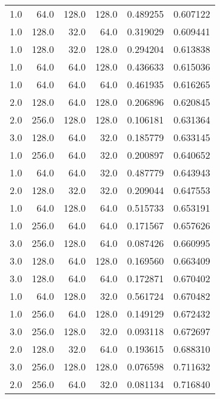 \begin{longtable}{rrrrrr}
        1.0 &      64.0 &       128.0 &    128.0 &      0.489255 &    0.607122 \\
        1.0 &     128.0 &        32.0 &     64.0 &      0.319029 &    0.609441 \\
        1.0 &     128.0 &        32.0 &    128.0 &      0.294204 &    0.613838 \\
        1.0 &      64.0 &        64.0 &    128.0 &      0.436633 &    0.615036 \\
        1.0 &      64.0 &        64.0 &     64.0 &      0.461935 &    0.616265 \\
        2.0 &     128.0 &        64.0 &    128.0 &      0.206896 &    0.620845 \\
        2.0 &     256.0 &       128.0 &    128.0 &      0.106181 &    0.631364 \\
        3.0 &     128.0 &        64.0 &     32.0 &      0.185779 &    0.633145 \\
        1.0 &     256.0 &        64.0 &     32.0 &      0.200897 &    0.640652 \\
        1.0 &      64.0 &        64.0 &     32.0 &      0.487779 &    0.643943 \\
        2.0 &     128.0 &        32.0 &     32.0 &      0.209044 &    0.647553 \\
        1.0 &      64.0 &       128.0 &     64.0 &      0.515733 &    0.653191 \\
        1.0 &     256.0 &        64.0 &     64.0 &      0.171567 &    0.657626 \\
        3.0 &     256.0 &       128.0 &     64.0 &      0.087426 &    0.660995 \\
        3.0 &     128.0 &        64.0 &    128.0 &      0.169560 &    0.663409 \\
        3.0 &     128.0 &        64.0 &     64.0 &      0.172871 &    0.670402 \\
        1.0 &      64.0 &       128.0 &     32.0 &      0.561724 &    0.670482 \\
        1.0 &     256.0 &        64.0 &    128.0 &      0.149129 &    0.672432 \\
        3.0 &     256.0 &       128.0 &     32.0 &      0.093118 &    0.672697 \\
        2.0 &     128.0 &        32.0 &     64.0 &      0.193615 &    0.688310 \\
        3.0 &     256.0 &       128.0 &    128.0 &      0.076598 &    0.711632 \\
        2.0 &     256.0 &        64.0 &     32.0 &      0.081134 &    0.716840 \\

\end{longtable}
